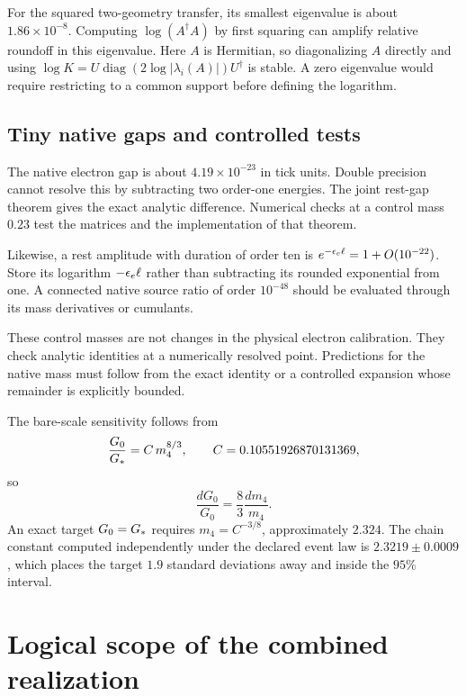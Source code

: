 For the squared two-geometry transfer, its smallest eigenvalue is about $1.86\times10^{-8}$. Computing $\log(A^\dagger A)$ by first squaring can amplify relative roundoff in this eigenvalue. Here $A$ is Hermitian, so diagonalizing $A$ directly and using
$\log K=U\operatorname{diag}(2\log|\lambda_i(A)|)U^\dagger$
is stable. A zero eigenvalue would require restricting to a common support before defining the logarithm.

\subsection{Tiny native gaps and controlled tests}

The native electron gap is about $4.19\times10^{-23}$ in tick units. Double precision cannot resolve this by subtracting two order-one energies. The joint rest-gap theorem gives the exact analytic difference. Numerical checks at a control mass $0.23$ test the matrices and the implementation of that theorem.

Likewise, a rest amplitude with duration of order ten is
$e^{-\epsilon_e\ell}=1+O(10^{-22})$. Store its logarithm $-\epsilon_e\ell$ rather than subtracting its rounded exponential from one. A connected native source ratio of order $10^{-48}$ should be evaluated through its mass derivatives or cumulants.

These control masses are not changes in the physical electron calibration. They check analytic identities at a numerically resolved point. Predictions for the native mass must follow from the exact identity or a controlled expansion whose remainder is explicitly bounded.

The bare-scale sensitivity follows from
\begin{equation}
\frac{G_0}{G_*}=C\,m_4^{8/3},\qquad
C=0.10551926870131369,
\end{equation}
so
\begin{equation}
\frac{dG_0}{G_0}=\frac83\frac{dm_4}{m_4}.
\end{equation}
An exact target $G_0=G_*$ requires $m_4=C^{-3/8}$, approximately $2.324$. The chain constant computed independently under the declared event law is $2.3219\pm0.0009$, which places the target $1.9$ standard deviations away and inside the $95\%$ interval.

\section{Logical scope of the combined realization}
\label{app:scope}

